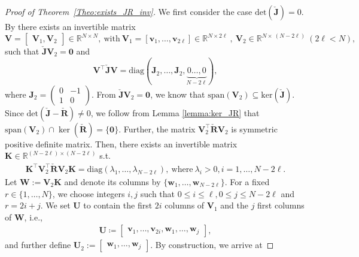 \documentclass{article}
\newcommand{\bmK}{\bm{K}}
\newcommand{\bmv}{\bm{v}}
\newcommand{\bmU}{\bm{U}}
\newcommand{\bmV}{\bm{V}}
\newcommand{\bmw}{\bm{w}}
\newcommand{\bmW}{\bm{W}}
\newcommand{\bmJ}{\bm{J}}
\newcommand{\bmR}{\bm{R}}
\newcommand{\R}{\mathbb{R}}
\newcommand{\Jmat}[1]{\mathbf{J}_{#1}}%
\newcommand{\jtwo}{\Jmat{2}}
\newcommand{\bzero}{\mathbf{0}}
\newcommand{\FOMsize}{N}
\newcommand{\Jcheck}{\check{\bmJ}}
\newcommand{\Rcheck}{\check{\bmR}}
\begin{document}
\begin{proof}[Proof of Theorem~\ref{Theo:exists_JR_inv}]
We first consider the case $\mathrm{det}(\Jcheck)=0$. By \cite[Theorem 2.2]{benner2000cholesky} there exists an invertible matrix
					\begin{equation*}
						\bmV=
						\begin{bmatrix}
							\bmV_1,\bmV_2
						\end{bmatrix}\in\R^{\FOMsize\times \FOMsize},\
						\mathrm{with}\
						\bmV_1 =[\bmv_1,\ldots,\bmv_{2\ell}]
						\in\R^{\FOMsize\times 2\ell}\
						,\
						\bmV_2\in\R^{\FOMsize\times\ (\FOMsize-2\ell)}
						\
						(2\ell<\FOMsize),
					\end{equation*}
					such that $\Jcheck \bmV_2 = \bzero$ and 
					\begin{equation*}
						\label{equ:GMG_exists_proof_SR_decomp}
						\bmV^{\top}\Jcheck\bmV = \mathrm{diag}(\jtwo,\ldots,\jtwo,\underbrace{0\ldots,0}_{\FOMsize-2\ell}),
					\end{equation*}
					where $\jtwo =\begin{pmatrix}
						0&-1\\
						1&0
					\end{pmatrix}$. 
From $\Jcheck \bmV_2 = \bzero$, we know that $\mathrm{span}(\bmV_2)\subseteq \mathrm{ker}\left(\Jcheck\right)$. Since $\mathrm{det}(\Jcheck-\Rcheck)\neq 0$, 
					we follow from Lemma \ref{lemma:ker_JR} that $\mathrm{span}(\bmV_2)\cap \ker(\Rcheck)=\{\bzero\}$. 
				 	Further, the matrix $\bmV_2^{\top}\Rcheck\bmV_2$ is symmetric positive definite matrix. Then, there exists an invertible matrix $\bmK\in\R^{(\FOMsize-2\ell)\times (\FOMsize-2\ell)}$ s.t.
					\begin{align*}
						\bmK^{\top}\bmV_2^{\top}\Rcheck\bmV_2\bmK \allowbreak= \mathrm{diag}
						(\lambda_1,\ldots,\lambda_{\FOMsize-2\ell}),
						\ \mathrm{where}\
						\lambda_{i}>0, i=1,\ldots, \FOMsize-2\ell.
					\end{align*}
					Let $\bmW := \bmV_2\bmK$ and denote its columns by $\{\bmw_1,\ldots,\bmw_{\FOMsize-2\ell}\}$. For a fixed $r \in \{1, \dots, \FOMsize\}$, we choose integers $i,j$ such that 					$0\leq i\leq \ell, 0\leq j\leq \FOMsize-2\ell$ and $r = 2i+j$. We set $\bmU$ to contain the first $2i$ columns of $\bmV_1$ and the $j$ first columns of $\bmW$, i.e., 
					\begin{align*}\bmU \coloneqq 
					\begin{bmatrix}
						\bmv_1,\ldots,\bmv_{2i},\bmw_1,\ldots,\bmw_j
					\end{bmatrix},
					\end{align*}
					and further define $\bmU_2 := \begin{bmatrix} \bmw_1,\ldots,\bmw_j \end{bmatrix}$. By construction, we arrive at 

\end{proof}
\end{document}
